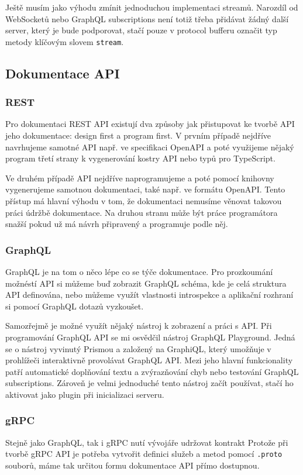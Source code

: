 \documentclass[thesis=M,czech]{FITthesis}[2019/12/23]
\begin{document}
Ještě musím jako výhodu zmínit jednoduchou implementaci streamů. Narozdíl od  WebSocketů nebo GraphQL subscriptions není totiž třeba přidávat žádný další server, který je bude podporovat, stačí pouze v protocol bufferu označit typ metody klíčovým slovem \texttt{stream}.


\subsection*{Dokumentace API}
\subsubsection*{REST}
Pro dokumentaci REST API existují dva způsoby jak přistupovat ke tvorbě API jeho dokumentace: design first a program first.%
V prvním případě nejdříve navrhujeme samotné API např. ve specifikaci OpenAPI a poté využijeme nějaký program třetí strany k vygenerování kostry API nebo typů pro TypeScript.

Ve druhém případě API nejdříve naprogramujeme a poté pomocí knihovny vygenerujeme samotnou dokumentaci, také např. ve formátu OpenAPI. Tento přístup má hlavní výhodu v tom, že dokumentaci nemusíme věnovat takovou práci údržbě dokumentace. Na druhou stranu může být práce programátora snažší pokud už má návrh připravený a programuje podle něj.

\subsubsection*{GraphQL}
GraphQL je na tom o něco lépe co se týče dokumentace. Pro prozkoumání možnéstí API si můžeme buď zobrazit GraphQL schéma, kde je celá struktura API definována, nebo můžeme využít vlastnosti introspekce a aplikační rozhraní si pomocí GraphQL dotazů vyzkoušet.

Samozřejmě je možné využít nějaký nástroj k zobrazení a práci s API. Při programování GraphQL API se mi osvědčil nástroj GraphQL Playground. %
Jedná se o nástroj vyvinutý Prismou a založený na GraphiQL, který umožňuje v prohlížeči interaktivně provolávat GraphQL API. Mezi jeho hlavní funkcionality patří automatické doplňování textu a zvýrazňování chyb nebo testování GraphQL subscriptions. Zároveň je velmi jednoduché tento nástroj začít používat, stačí ho aktivovat jako plugin při inicializaci serveru.


\subsubsection*{gRPC}
Stejně jako GraphQL, tak i gRPC nutí vývojáře udržovat kontrakt 
Protože při tvorbě gRPC API je potřeba vytvořit definici služeb a metod pomocí \texttt{.proto} souborů, máme tak určitou formu dokumentace API přímo dostupnou.
\end{document}
